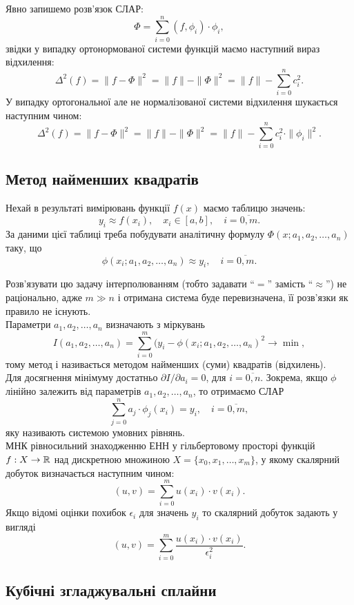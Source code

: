 Явно запишемо розв'язок СЛАР: \[ \Phi = \sum_{i = 0}^n (f, \phi_i) \cdot \phi_i, \] звідки у випадку ортонормованої системи функцій маємо наступний вираз відхилення: \[ \Delta^2(f) = \|f - \Phi\|^2 = \|f\| - \|\Phi\|^2 = \|f\| - \sum_{i=0}^n c_i^2.\] У випадку ортогональної але не нормалізованої системи відхилення шукається наступним чином: \[ \Delta^2(f) = \|f - \Phi\|^2 = \|f\| - \|\Phi\|^2 = \|f\| - \sum_{i=0}^n c_i^2 \cdot \|\phi_i\|^2.\]

\subsection{Метод найменших квадратів}

Нехай в результаті вимірювань функції $f(x)$ маємо таблицю значень: \[ y_i \approx f(x_i), \quad x_i \in [a, b], \quad i = \overline{0, m}.\] За даними цієї таблиці треба побудувати аналітичну формулу $\Phi(x; a_1, a_2, \ldots, a_n)$ таку, що \[ \phi(x_i; a_1, a_2, \ldots, a_n) \approx y_i, \quad i = \overline{0, m}.\] 

Розв'язувати цю задачу інтерполюванням (тобто задавати ``$=$'' замість ``$\approx$'') не раціонально, адже $m \gg n$ і отримана система буде перевизначена, її розв'язки як правило не існують. \\

Параметри $a_1, a_2, \ldots, a_n$ визначають з міркувань \[I(a_1, a_2, \ldots, a_n) = \sum_{i = 0}^m (y_i - \phi(x_i; a_1, a_2, \ldots, a_n)^2 \to \min,\] тому метод і називається методом найменших (суми) квадратів (відхилень). \\

Для досягнення мінімуму достатньо $\partial I / \partial a_i = 0$, для $i = \overline{0, n}$. Зокрема, якщо $\phi$ лінійно залежить від параметрів $a_1, a_2, \ldots, a_n$, то отримаємо СЛАР \[ \sum_{j = 0}^n a_j \cdot \phi_j(x_i) = y_i, \quad i = \overline{0, m},\] яку називають системою умовних рівнянь. \\

МНК рівносильний знаходженню ЕНН у гільбертовому просторі функцій $f: X \to \mathbb{R}$ над дискретною множиною $X = \{x_0, x_1, \ldots, x_m\}$, у якому скалярний добуток визначається наступним чином: \[ (u, v) = \sum_{i = 0}^m u(x_i) \cdot v(x_i). \] Якщо відомі оцінки похибок $\epsilon_i$ для значень $y_i$ то скалярний добуток задають у вигляді \[ (u, v) = \sum_{i = 0}^m \frac{u(x_i) \cdot v(x_i)}{\epsilon_i^2}. \]

\subsection{Кубічні згладжувальні сплайни}

